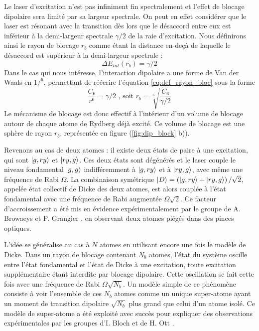 Le laser d'excitation n'est pas infiniment fin spectralement et l'effet de blocage dipolaire sera limité par sa largeur spectrale.
On peut en effet considérer que le laser est résonant avec la transition dès lors que le désaccord entre eux est inférieur à la demi-largeur spectrale $\gamma/2$ de la raie d'excitation.
Nous définirons ainsi le \og rayon de blocage \fg{} $r_b$ comme étant la distance en-deçà de laquelle le désaccord est supérieur à la demi-largeur spectrale :
\begin{equation}
\label{eq:def_rayon_bloc}
\Delta E_{int}(r_b) = \gamma /2 
\end{equation}
%
Dans le cas qui nous intéresse, l'interaction dipolaire a une forme de Van der Waals en $1/^6$, permettant de réécrire l'équation \eqref{eq:def_rayon_bloc} sous la forme
\begin{equation}
\label{eq:def_rayon_bloc}
\frac{C_6}{r^6} = \gamma /2 \text{ , soit } r_b = \sqrt[6]{\frac{C_6}{\gamma /2}}
\end{equation}
%
Le mécanisme de blocage est donc effectif à l'intérieur d'un \og volume de blocage\fg{} autour de chaque atome de Rydberg déjà excité.
Ce volume de blocage est une sphère de rayon $r_b$, représentée en figure (\ref{fig:dip_block} b)).

Revenons au cas de deux atomes :
il existe deux états de paire à une excitation, qui sont $\ket{g,ry}$ et $\ket{ry,g}$.
Ces deux états sont dégénérés et le laser couple le niveau fondamental $\ket{g,g}$ indifféremment à $\ket{g,ry}$ et à $\ket{ry,g}$, avec même une fréquence de Rabi $\Omega$.
La combinaison symétrique $\ket{D} = \left( \ket{g,ry} + \ket{ry,g} \right) / \sqrt{2}$, appelée état collectif de Dicke des deux atomes, est alors couplée à l'état fondamental avec une fréquence de Rabi augmentée $\Omega\sqrt{2}$.
Ce facteur d'accroissement a été mis en évidence expérimentalement par le groupe de A. Browaeys et P. Grangier \cite{MX_BROWAEYS_COLLECRABIBLOCK}, en observant deux atomes piégés dans des pinces optiques.

L'idée se généralise au cas à $N$ atomes en utilisant encore une fois le modèle de Dicke.
Dans un rayon de blocage contenant $N_b$ atomes, l'état du système oscille entre l'état fondamental et l'état de Dicke à une excitation, toute excitation supplémentaire étant interdite par blocage dipolaire.
Cette oscillation se fait cette fois avec une fréquence de Rabi $\Omega\sqrt{N_b}$.
Un modèle simple de ce phénomène consiste à voir l'ensemble de ces $N_b$ atomes comme un unique \og super-atome \fg{} ayant un moment de transition dipolaire $\sqrt{N_b}$ plus grand  que celui d'un atome isolé.
Ce modèle de super-atome a été exploité avec succès pour expliquer des observations expérimentales par les groupes d'I. Bloch \cite{MX_BLOCH_SUPERATOM} et de H. Ott \cite{MX_OTT_SUPERATOM}.


